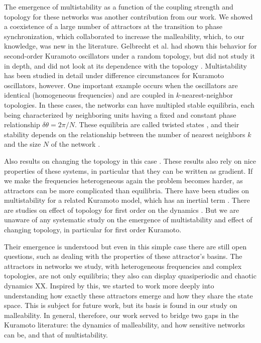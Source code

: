 The emergence of multistability as a function of the coupling strength and topology for these networks was another contribution from our work. We showed a coexistence of a large number of attractors at the transition to phase synchronization, which collaborated to increase the malleability, which, to our knowledge, was new in the literature. Gelbrecht et al. had shown this behavior for second-order Kuramoto oscillators under a random topology, but did not study it in depth, and did not look at its dependence with the topology \cite{gelbrecht2020monte}. Multistability has been studied in detail under difference circumstances for Kuramoto oscillators, however. One important example occurs when the oscillators are identical (homogeneous frequencies) and are coupled in $k$-nearest-neighbor topologies. In these cases, the networks can have multipled stable equilibria, each being characterized by neighboring units having a fixed and constant phase relationship $\delta \theta = 2\pi/N$. These equilibria are called twisted states \cite{wiley2006the}, and their stability depends on the relationship between the number of nearest neighbors $k$ and the size $N$ of the network \cite{wiley2006the}.

Also results on changing the topology in this case \cite{townsend2020dense}. These results also rely on nice properties of these systems, in particular that they can be written as gradient. If we make the frequencies heterogeneous again the problem becomes harder, as attractors can be more complicated than equilibria. There have been studies on multistability for a related Kuramoto model, which has an inertial term \cite{gelbrecht2020monte, hellmann2020network}. There are studies on effect of topology for first order on the dynamics \cite{halekotte2021transient, potratzki2024synchronization}. But we are unaware of any systematic study on the emergence of multistability and effect of changing topology, in particular for first order Kuramoto.

Their emergence is understood but even in this simple case there are still open questions, such as dealing with the properties of these attractor's basins. The attractors in networks we study, with heterogeneous frequencies and complex topologies, are not only equilibria; they also can display quasiperiodic and chaotic dynamics XX. Inspired by this, we started to work more deeply into understanding how exactly these attractors emerge and how they share the state space. This is subject for future work, but its basis is found in our study on malleability. In general, therefore, our work served to bridge two gaps in the Kuramoto literature: the dynamics of malleability, and how sensitive networks can be, and that of multistability. 


